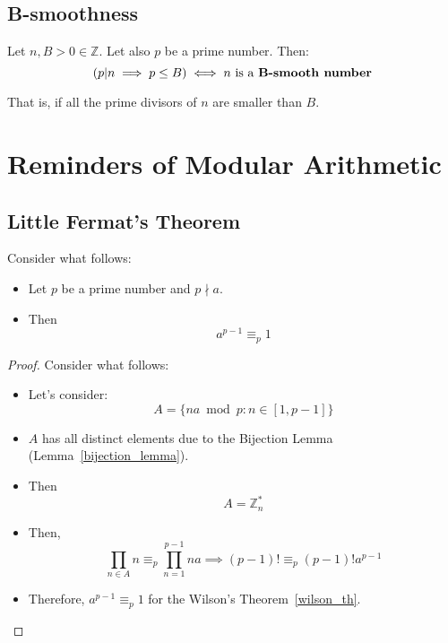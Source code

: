\subsection{B-smoothness}
\begin{definition}[B-smoothness]
    Let $n, B > 0 \in \mathbb{Z}$. Let also $p$ be a prime number. Then:
    \[(p|n \implies p \leq B) \iff n \text{ is a \textbf{B-smooth number}}\]
\end{definition}
That is, if all the prime divisors of $n$ are smaller than $B$.

\section{Reminders of Modular Arithmetic}
\subsection{Little Fermat's Theorem}\label{little_fermat_theorem}
\begin{theorem}
    Consider what follows:
    \begin{itemize}
        \item Let $p$ be a prime number and $p \nmid a$.
        \item Then \[a^{p-1} \equiv_{p} 1\]
    \end{itemize}
\end{theorem}
\begin{proof}
    Consider what follows:
    \begin{itemize}
        \item Let's consider: \[A = \{na \bmod p: n \in [1, p-1]\}\]
        \item $A$ has all distinct elements due to the Bijection Lemma (Lemma~\ref{bijection_lemma}).
        \item Then \[A = \mathbb{Z}_{n}^{*}\]
        \item Then, \[\prod\limits_{n \in A} n \equiv_{p} \prod\limits_{n=1}^{p-1} na \implies (p-1)! \equiv_{p} (p-1)!a^{p-1}\]
        \item Therefore, $a^{p-1} \equiv_{p} 1$ for the Wilson's Theorem~\ref{wilson_th}.
    \end{itemize}
\end{proof}

